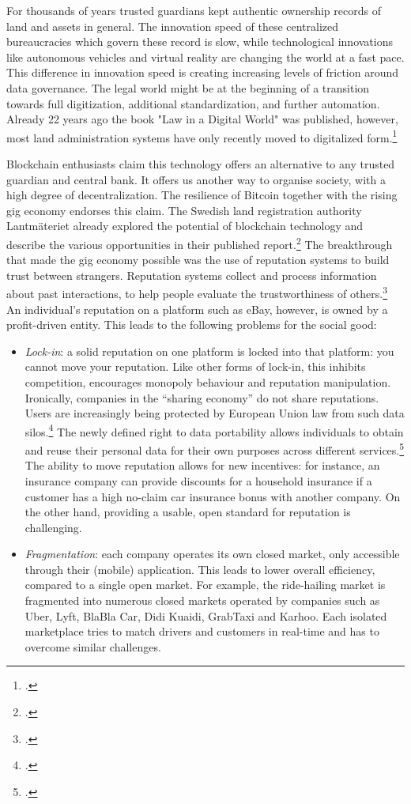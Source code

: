 \documentclass[USenglish]{article}
\begin{document}
For thousands of years trusted guardians kept authentic ownership records of land and assets in general.
The innovation speed of these centralized bureaucracies which govern these record is slow, while technological innovations like autonomous vehicles and virtual reality are changing the world at a fast pace. %
This difference in innovation speed is creating increasing levels of friction around data governance. 
The legal world might be at the beginning of a transition towards full digitization, additional standardization, and further automation. 
Already 22 years ago the book "Law in a Digital World" was published, however, most land administration systems have only recently moved to digitalized form.\footcite{katsh1995law}

Blockchain enthusiasts claim this technology offers an alternative to any trusted guardian and central bank.
It offers us another way to organise society, with a high degree of decentralization.
The resilience of Bitcoin together with the rising gig economy endorses this claim.
The Swedish land registration authority Lantm\"{a}teriet already explored the potential of blockchain technology and describe the various opportunities in their published report.\footcite{landregistration2016blockchain}
The breakthrough that made the gig economy possible was the use of reputation systems to build trust between strangers.
Reputation systems collect and process information about past interactions, to help people evaluate the trustworthiness of others.\footcite{resnick2002trust}
An individual’s reputation on a platform such as eBay, however, is owned by a profit-driven entity.
This leads to the following problems for the social good:
\begin{itemize}
	\item \emph{Lock-in}: a solid reputation on one platform is locked into that platform: you cannot move your reputation. Like other forms of lock-in, this inhibits competition, encourages monopoly behaviour and reputation manipulation. Ironically, companies in the \enquote{sharing economy} do not share reputations. Users are increasingly being protected by European Union law from such data silos.\footcite{eudataprotection} The newly defined right to data portability allows individuals to obtain and reuse their personal data for their own purposes across different services.\footcite{dataportabilityeu} The ability to move reputation allows for new incentives: for instance, an insurance company can provide discounts for a household insurance if a customer has a high no-claim car insurance bonus with another company. On the other hand, providing a usable, open standard for reputation is challenging.
	\item \emph{Fragmentation}: each company operates its own closed market, only accessible through their (mobile) application. This leads to lower overall efficiency, compared to a single open market. For example, the ride-hailing market is fragmented into numerous closed markets operated by companies such as Uber, Lyft, BlaBla Car, Didi Kuaidi, GrabTaxi and Karhoo. Each isolated marketplace tries to match drivers and customers in real-time and has to overcome similar challenges.
\end{itemize}
\end{document}
